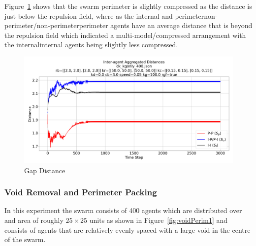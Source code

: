 \documentclass[12pt,a4paper]{IEEEtran}
\begin{document}
Figure~\ref{fig:gapDistance} shows that the swarm perimeter is slightly compressed as the distance is just below the repulsion field, where as the internal and perimeter\textrightarrow non-perimeter/non-perimeter\textrightarrow perimeter agents have an average distance that is beyond the repulsion field which indicated a multi-model/compressed arrangement with the internal\textrightarrow internal agents being slightly less compressed.

\begin{figure}[H]
	\begin{center}
		\includegraphics[width=1.0\linewidth]{figures/gapDistance}
	\end{center}
	\caption{Gap Distance\label{fig:gapDistance}}
\end{figure}

\subsubsection{Void Removal and Perimeter Packing}

In this experiment the swarm consists of 400 agents which are distributed over and area of roughly $25\times 25$ units as shown in Figure~\ref{fig:voidPerim1} and consists of agents that are relatively evenly spaced with a large void in the centre of the swarm. 
\end{document}
